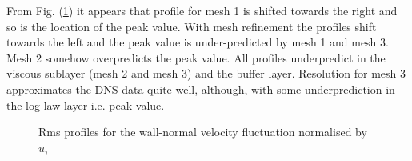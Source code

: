 From Fig. (\ref{vrms wale}) it appears that profile for mesh 1 is shifted towards the right and so is the location of the peak value. With mesh refinement the profiles shift towards the left and the peak value is under-predicted by mesh 1 and mesh 3. Mesh 2 somehow overpredicts the peak value. All profiles underpredict in the viscous sublayer (mesh 2 and mesh 3) and the buffer layer. Resolution for mesh 3 approximates the DNS data quite well, although, with some underprediction in the log-law layer i.e. peak value.
%
\begin{figure}[h!]
\begin{minipage}[b]{0.5\textwidth}
\end{minipage}
%
\begin{minipage}[b]{0.5\textwidth}
\end{minipage}
\caption{Rms profiles for the wall-normal velocity fluctuation normalised by $u_\tau$}
\label{vrms wale}
\end{figure}


